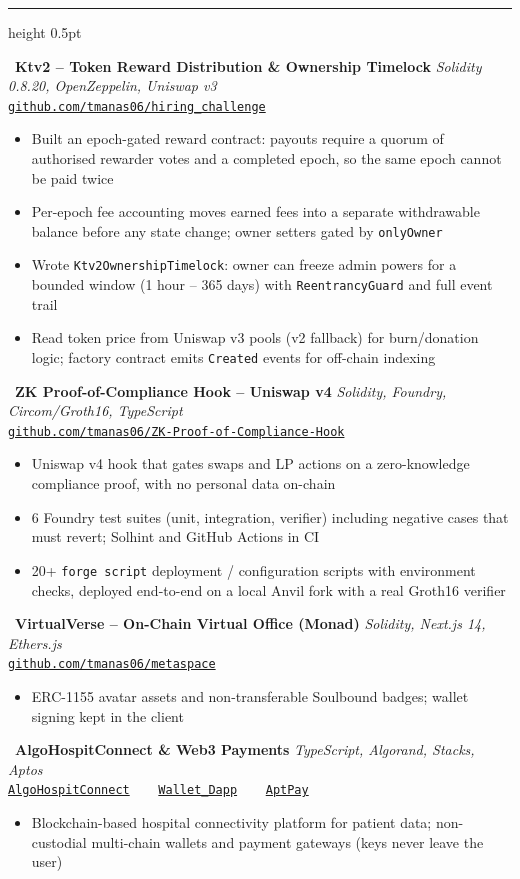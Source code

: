 \documentclass[11pt,a4paper]{article}
\newcommand{\cvsection}[1]{%
  \vspace{6pt}%
  \noindent{\large\textbf{\MakeUppercase{#1}}}%
  \vspace{2pt}%
  \hrule height 0.5pt%
  \vspace{4pt}%
}
\newcommand{\projectentry}[4]{%
  \noindent
  \faGithub\ \textbf{#1} \hfill \textit{#2} \\
  {\small\texttt{#3}}
  \begin{itemize}[leftmargin=1.5em, itemsep=0.5pt, parsep=0pt, topsep=1pt]
    #4
  \end{itemize}
  \vspace{2pt}
}
\begin{document}
\cvsection{Smart Contract Work}

\projectentry{Ktv2 -- Token Reward Distribution \& Ownership Timelock}%
  {Solidity 0.8.20, OpenZeppelin, Uniswap v3}%
  {\href{https://github.com/tmanas06/hiring_challenge}{github.com/tmanas06/hiring\_challenge}}%
  {\item Built an epoch-gated reward contract: payouts require a quorum of authorised rewarder votes and a completed epoch, so the same epoch cannot be paid twice
   \item Per-epoch fee accounting moves earned fees into a separate withdrawable balance before any state change; owner setters gated by \texttt{onlyOwner}
   \item Wrote \texttt{Ktv2OwnershipTimelock}: owner can freeze admin powers for a bounded window (1 hour -- 365 days) with \texttt{ReentrancyGuard} and full event trail
   \item Read token price from Uniswap v3 pools (v2 fallback) for burn/donation logic; factory contract emits \texttt{Created} events for off-chain indexing}

\projectentry{ZK Proof-of-Compliance Hook -- Uniswap v4}%
  {Solidity, Foundry, Circom/Groth16, TypeScript}%
  {\href{https://github.com/tmanas06/ZK-Proof-of-Compliance-Hook}{github.com/tmanas06/ZK-Proof-of-Compliance-Hook}}%
  {\item Uniswap v4 hook that gates swaps and LP actions on a zero-knowledge compliance proof, with no personal data on-chain
   \item 6 Foundry test suites (unit, integration, verifier) including negative cases that must revert; Solhint and GitHub Actions in CI
   \item 20+ \texttt{forge script} deployment / configuration scripts with environment checks, deployed end-to-end on a local Anvil fork with a real Groth16 verifier}

\projectentry{VirtualVerse -- On-Chain Virtual Office (Monad)}%
  {Solidity, Next.js 14, Ethers.js}%
  {\href{https://github.com/tmanas06/metaspace}{github.com/tmanas06/metaspace}}%
  {\item ERC-1155 avatar assets and non-transferable Soulbound badges; wallet signing kept in the client}

\projectentry{AlgoHospitConnect \& Web3 Payments}%
  {TypeScript, Algorand, Stacks, Aptos}%
  {\href{https://github.com/tmanas06/AlgoHospitConnect}{AlgoHospitConnect} \ \textbar\ \ \href{https://github.com/tmanas06/Wallet_Dapp}{Wallet\_Dapp} \ \textbar\ \ \href{https://github.com/tmanas06/AptPay}{AptPay}}%
  {\item Blockchain-based hospital connectivity platform for patient data; non-custodial multi-chain wallets and payment gateways (keys never leave the user)}
\end{document}
